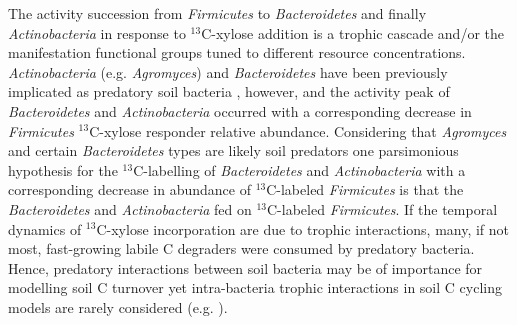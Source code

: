 The activity succession from \textit{Firmicutes} to \textit{Bacteroidetes} and
finally \textit{Actinobacteria} in response to $^{13}$C-xylose addition is
a trophic cascade and/or the manifestation functional groups tuned to different
resource concentrations. \textit{Actinobacteria} (e.g. \textit{Agromyces}) and
\textit{Bacteroidetes} have been previously implicated as predatory soil
bacteria \citep{Lueders2006,16346402}, however, and the activity peak of
\textit{Bacteroidetes} and \textit{Actinobacteria} occurred with
a corresponding decrease in \textit{Firmicutes} $^{13}$C-xylose responder
relative abundance. Considering that \textit{Agromyces} and certain
\textit{Bacteroidetes} types are likely soil predators one parsimonious
hypothesis for the $^{13}$C-labelling of \textit{Bacteroidetes} and
\textit{Actinobacteria} with a corresponding decrease in abundance of
$^{13}$C-labeled \textit{Firmicutes} is that the \textit{Bacteroidetes} and
\textit{Actinobacteria} fed on $^{13}$C-labeled \textit{Firmicutes}. If the
temporal dynamics of $^{13}$C-xylose incorporation are due to trophic
interactions, many, if not most, fast-growing labile C degraders were consumed
by predatory bacteria. Hence, predatory interactions between soil bacteria may
be of importance for modelling soil C turnover yet intra-bacteria trophic
interactions in soil C cycling models are rarely considered (e.g.
\citep{Moore1988}).

